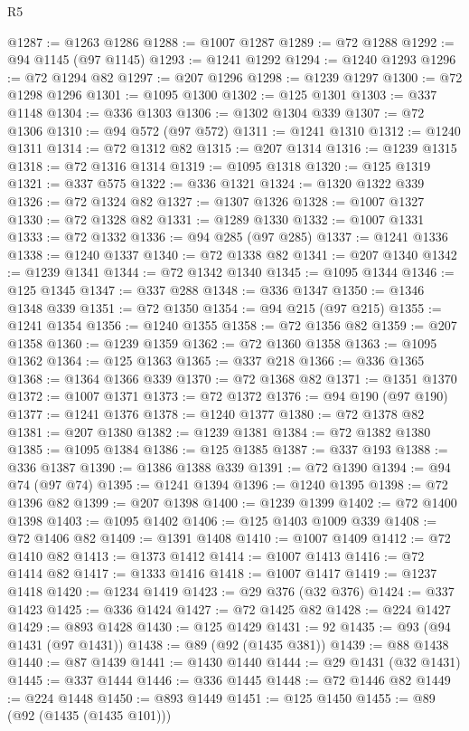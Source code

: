 \begin{lexlean}{R5}
\begin{coremodule}
@1287 := @1263 @1286
@1288 := @1007 @1287
@1289 := @72 @1288
@1292 := @94 @1145 (@97 @1145)
@1293 := @1241 @1292
@1294 := @1240 @1293
@1296 := @72 @1294 @82
@1297 := @207 @1296
@1298 := @1239 @1297
@1300 := @72 @1298 @1296
@1301 := @1095 @1300
@1302 := @125 @1301
@1303 := @337 @1148
@1304 := @336 @1303
@1306 := @1302 @1304 @339
@1307 := @72 @1306
@1310 := @94 @572 (@97 @572)
@1311 := @1241 @1310
@1312 := @1240 @1311
@1314 := @72 @1312 @82
@1315 := @207 @1314
@1316 := @1239 @1315
@1318 := @72 @1316 @1314
@1319 := @1095 @1318
@1320 := @125 @1319
@1321 := @337 @575
@1322 := @336 @1321
@1324 := @1320 @1322 @339
@1326 := @72 @1324 @82
@1327 := @1307 @1326
@1328 := @1007 @1327
@1330 := @72 @1328 @82
@1331 := @1289 @1330
@1332 := @1007 @1331
@1333 := @72 @1332
@1336 := @94 @285 (@97 @285)
@1337 := @1241 @1336
@1338 := @1240 @1337
@1340 := @72 @1338 @82
@1341 := @207 @1340
@1342 := @1239 @1341
@1344 := @72 @1342 @1340
@1345 := @1095 @1344
@1346 := @125 @1345
@1347 := @337 @288
@1348 := @336 @1347
@1350 := @1346 @1348 @339
@1351 := @72 @1350
@1354 := @94 @215 (@97 @215)
@1355 := @1241 @1354
@1356 := @1240 @1355
@1358 := @72 @1356 @82
@1359 := @207 @1358
@1360 := @1239 @1359
@1362 := @72 @1360 @1358
@1363 := @1095 @1362
@1364 := @125 @1363
@1365 := @337 @218
@1366 := @336 @1365
@1368 := @1364 @1366 @339
@1370 := @72 @1368 @82
@1371 := @1351 @1370
@1372 := @1007 @1371
@1373 := @72 @1372
@1376 := @94 @190 (@97 @190)
@1377 := @1241 @1376
@1378 := @1240 @1377
@1380 := @72 @1378 @82
@1381 := @207 @1380
@1382 := @1239 @1381
@1384 := @72 @1382 @1380
@1385 := @1095 @1384
@1386 := @125 @1385
@1387 := @337 @193
@1388 := @336 @1387
@1390 := @1386 @1388 @339
@1391 := @72 @1390
@1394 := @94 @74 (@97 @74)
@1395 := @1241 @1394
@1396 := @1240 @1395
@1398 := @72 @1396 @82
@1399 := @207 @1398
@1400 := @1239 @1399
@1402 := @72 @1400 @1398
@1403 := @1095 @1402
@1406 := @125 @1403 @1009 @339
@1408 := @72 @1406 @82
@1409 := @1391 @1408
@1410 := @1007 @1409
@1412 := @72 @1410 @82
@1413 := @1373 @1412
@1414 := @1007 @1413
@1416 := @72 @1414 @82
@1417 := @1333 @1416
@1418 := @1007 @1417
@1419 := @1237 @1418
@1420 := @1234 @1419
@1423 := @29 @376 (@32 @376)
@1424 := @337 @1423
@1425 := @336 @1424
@1427 := @72 @1425 @82
@1428 := @224 @1427
@1429 := @893 @1428
@1430 := @125 @1429
@1431 := 92
@1435 := @93 (@94 @1431 (@97 @1431))
@1438 := @89 (@92 (@1435 @381))
@1439 := @88 @1438
@1440 := @87 @1439
@1441 := @1430 @1440
@1444 := @29 @1431 (@32 @1431)
@1445 := @337 @1444
@1446 := @336 @1445
@1448 := @72 @1446 @82
@1449 := @224 @1448
@1450 := @893 @1449
@1451 := @125 @1450
@1455 := @89 (@92 (@1435 (@1435 @101)))

\end{coremodule}
\end{lexlean}
